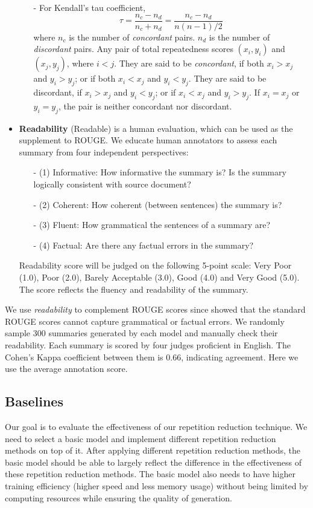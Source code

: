 \begin{itemize}
\begin{itemize}
\item[-] For Kendall's tau coefficient,
\begin{equation}
\tau = \frac{n_c - n_d}{n_c + n_d} = \frac{n_c - n_d}{n(n-1)/2}
\end{equation}
where $n_c$ is the number of \textit{concordant} pairs.
$n_d$ is the number of \textit{discordant} pairs.
Any pair of total repeatedness scores $(x_{i},y_{i})$ and $(x_{j},y_{j})$, where $i<j$.
They are said to be \textit{concordant},
if both $x_{i}>x_{j}$ and $y_{i}>y_{j}$; or if both $x_{i}<x_{j}$ and $y_{i}<y_{j}$.
They are said to be discordant, if $x_{i}>x_{j}$ and $y_{i}<y_{j}$; 
or if $x_{i}<x_{j}$ and $y_{i}>y_{j}$. 
If $x_{i}=x_{j}$ or $y_{i}=y_{j}$, the pair is neither concordant nor discordant.
\end{itemize}


\item \textbf{Readability} (Readable) is a human evaluation,
which can be used as the supplement to ROUGE. 
We educate human annotators to assess each summary
from four independent perspectives: 
\begin{itemize}
\item[-]
(1) Informative: How informative the summary is? 
Is the summary logically consistent with source document? 
\item[-]
(2) Coherent: How coherent (between sentences) the summary is? 
\item[-]
(3) Fluent: How grammatical the sentences of a summary are? 
\item[-]
(4) Factual: Are there any factual errors in the summary?
\end{itemize}
Readability score will be judged on the following 5-point scale:
Very Poor (1.0), Poor (2.0), Barely Acceptable (3.0), Good (4.0) and Very Good (5.0).
The score reflects the fluency and readability of the summary.
\end{itemize}

We use \textit{readability} to complement ROUGE scores 
since \cite{YaoWX17} showed that the standard 
ROUGE scores cannot capture grammatical or factual errors. 
We randomly sample 300 summaries generated by each model
and manually check their readability. 
Each summary is scored by four judges proficient in English. 
The Cohen's Kappa coefficient between them is $0.66$, 
indicating agreement. Here we use the average annotation score.

\subsection{Baselines}
Our goal is to evaluate the
effectiveness of our repetition reduction technique.
We need to select a basic model and implement different repetition reduction methods on top of it. After applying different repetition reduction methods, the basic model should be able to largely reflect the difference in the effectiveness of these repetition reduction methods. The basic model also needs to have higher training efficiency (higher speed and less memory usage) without being limited by computing resources while ensuring the quality of generation.

